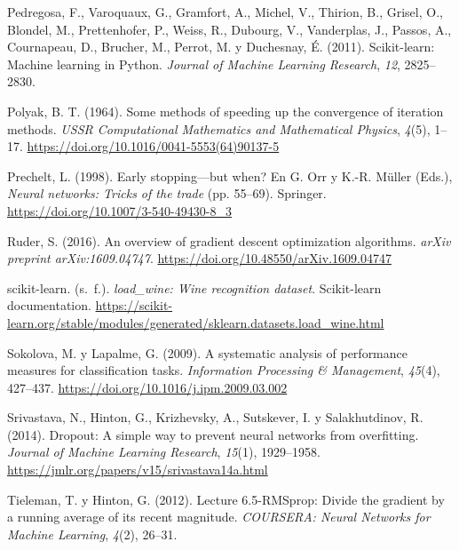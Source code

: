 \documentclass[12pt,letterpaper]{article}
\newcommand{\refapa}[1]{\par\noindent\hangindent=0.5in\hangafter=1 #1\par}
\begin{document}
\refapa{Pedregosa, F., Varoquaux, G., Gramfort, A., Michel, V., Thirion, B., Grisel, O., Blondel, M., Prettenhofer, P., Weiss, R., Dubourg, V., Vanderplas, J., Passos, A., Cournapeau, D., Brucher, M., Perrot, M. y Duchesnay, É. (2011). Scikit-learn: Machine learning in Python. \textit{Journal of Machine Learning Research}, \textit{12}, 2825--2830.}
\refapa{Polyak, B. T. (1964). Some methods of speeding up the convergence of iteration methods. \textit{USSR Computational Mathematics and Mathematical Physics}, \textit{4}(5), 1--17. \url{https://doi.org/10.1016/0041-5553(64)90137-5}}
\refapa{Prechelt, L. (1998). Early stopping---but when? En G. Orr y K.-R. Müller (Eds.), \textit{Neural networks: Tricks of the trade} (pp. 55--69). Springer. \url{https://doi.org/10.1007/3-540-49430-8_3}}
\refapa{Ruder, S. (2016). An overview of gradient descent optimization algorithms. \textit{arXiv preprint arXiv:1609.04747}. \url{https://doi.org/10.48550/arXiv.1609.04747}}
\refapa{scikit-learn. (s.~f.). \textit{load\_wine: Wine recognition dataset}. Scikit-learn documentation. \url{https://scikit-learn.org/stable/modules/generated/sklearn.datasets.load_wine.html}}
\refapa{Sokolova, M. y Lapalme, G. (2009). A systematic analysis of performance measures for classification tasks. \textit{Information Processing \& Management}, \textit{45}(4), 427--437. \url{https://doi.org/10.1016/j.ipm.2009.03.002}}
\refapa{Srivastava, N., Hinton, G., Krizhevsky, A., Sutskever, I. y Salakhutdinov, R. (2014). Dropout: A simple way to prevent neural networks from overfitting. \textit{Journal of Machine Learning Research}, \textit{15}(1), 1929--1958. \url{https://jmlr.org/papers/v15/srivastava14a.html}}
\refapa{Tieleman, T. y Hinton, G. (2012). Lecture 6.5-RMSprop: Divide the gradient by a running average of its recent magnitude. \textit{COURSERA: Neural Networks for Machine Learning}, \textit{4}(2), 26--31.}
\end{document}
